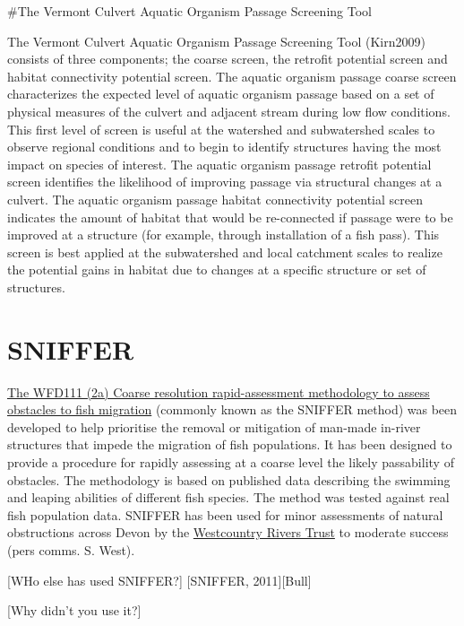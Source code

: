 \documentclass[]{article}
\begin{document}
\#The Vermont Culvert Aquatic Organism Passage Screening Tool

The Vermont Culvert Aquatic Organism Passage Screening Tool (Kirn2009)
consists of three components; the coarse screen, the retrofit potential
screen and habitat connectivity potential screen. The aquatic organism
passage coarse screen characterizes the expected level of aquatic
organism passage based on a set of physical measures of the culvert and
adjacent stream during low flow conditions. This first level of screen
is useful at the watershed and subwatershed scales to observe regional
conditions and to begin to identify structures having the most impact on
species of interest. The aquatic organism passage retrofit potential
screen identifies the likelihood of improving passage via structural
changes at a culvert. The aquatic organism passage habitat connectivity
potential screen indicates the amount of habitat that would be
re-connected if passage were to be improved at a structure (for example,
through installation of a fish pass). This screen is best applied at the
subwatershed and local catchment scales to realize the potential gains
in habitat due to changes at a specific structure or set of structures.

\hypertarget{sniffer}{%
\section{SNIFFER}\label{sniffer}}

\href{https://www.sniffer.org.uk/wfd111-phase-2a-fish-obstacles-manual-pdf}{The
WFD111 (2a) Coarse resolution rapid-assessment methodology to assess
obstacles to fish migration} (commonly known as the SNIFFER method) was
been developed to help prioritise the removal or mitigation of man-made
in-river structures that impede the migration of fish populations. It
has been designed to provide a procedure for rapidly assessing at a
coarse level the likely passability of obstacles. The methodology is
based on published data describing the swimming and leaping abilities of
different fish species. The method was tested against real fish
population data. SNIFFER has been used for minor assessments of natural
obstructions across Devon by the
\href{http://wrt.org.uk/sniffing-out-weirs/}{Westcountry Rivers Trust}
to moderate success (pers comms. S. West).

{[}WHo else has used SNIFFER?{]} {[}SNIFFER, 2011{]}{[}Bull{]}

{[}Why didn't you use it?{]}
\end{document}
